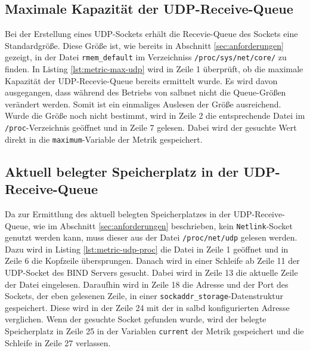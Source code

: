 \documentclass[a4paper, 12pt, BCOR10mm, DIV12, toc=bibliography, toc=listof, german]{scrbook}
\begin{document}
			\subsection*{Maximale Kapazität der UDP-Receive-Queue} %

			Bei der Erstellung eines UDP-Sockets erhält die Recevie-Queue des Sockets eine Standardgröße.
			Diese Größe ist, wie bereits in Abschnitt \ref{sec:anforderungen} gezeigt, in der Datei
			\texttt{rmem\_default} im Verzeichniss \texttt{/proc/sys/net/core/} zu finden. In Listing
			\ref{lst:metric-max-udp} wird in Zeile 1 überprüft, ob die maximale Kapazität der
			UDP-Recevie-Queue bereits ermittelt wurde.  Es wird davon ausgegangen, dass während des Betriebs von
			salbnet nicht die Queue-Größen verändert werden. Somit ist ein einmaliges Auslesen der Größe
			ausreichend. Wurde die Größe noch nicht bestimmt, wird in Zeile 2 die entsprechende Datei im
			\texttt{/proc}-Verzeichnis geöffnet und in Zeile 7 gelesen. Dabei wird der gesuchte Wert
			direkt in die \texttt{maximum}-Variable der Metrik gespeichert.

			


			\subsection*{Aktuell belegter Speicherplatz in der UDP-Receive-Queue} %

				Da zur Ermittlung des aktuell belegten Speicherplatzes in der UDP-Receive-Queue, wie im
				Abschnitt \ref{sec:anforderungen} beschrieben, kein \texttt{Netlink}-Socket genutzt werden
				kann, muss dieser aus der Datei \texttt{/proc/net/udp} gelesen werden. Dazu wird in Listing
				\ref{lst:metric-udp-proc} die Datei in Zeile 1 geöffnet und in Zeile 6 die Kopfzeile
				übersprungen. Danach wird in einer Schleife ab Zeile 11 der UDP-Socket des BIND Servers
				gesucht. Dabei wird in Zeile 13 die aktuelle Zeile der Datei eingelesen. Daraufhin wird in
				Zeile 18 die Adresse und der Port des Sockets, der eben gelesenen Zeile, in einer
				\texttt{sockaddr\_storage}-Datenstruktur gespeichert. Diese wird in der Zeile 24 mit der in
				salbd konfigurierten Adresse verglichen. Wenn der gesuchte Socket gefunden wurde, wird der
				belegte Speicherplatz in Zeile 25 in der Variablen \texttt{current} der Metrik gespeichert
				und die Schleife in Zeile 27 verlassen.
\end{document}
